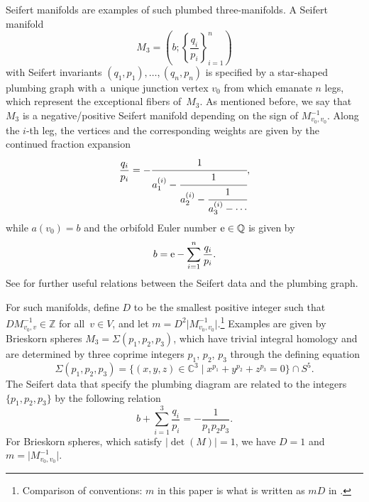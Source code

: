 \documentclass[pdftex]{sigma}
\theoremstyle{definition}
\numberwithin{equation}{section}
\begin{document}
Seifert manifolds are examples of such plumbed three-manifolds. A Seifert manifold
\begin{equation*}
 M_3=\left(b;\left\{\frac{q_i}{p_i}\right\}_{i=1}^{n}\right)
\end{equation*}
with Seifert invariants $(q_1,p_1), \ldots, (q_n, p_n)$ is specified by a star-shaped plumbing graph with a~unique junction vertex $v_0$ from which emanate $n$ legs, which represent the exceptional fibers of~$M_3$. As mentioned before, we say that $M_3$ is a negative/positive Seifert manifold depending on the sign of $M^{-1}_{v_0,v_0}$. Along the $i$-th leg, the vertices  and the corresponding weights 
are given by the continued fraction expansion
\begin{equation}
 \label{eqn:ctndfrac}
 \frac{q_i}{p_i}=-\cfrac{1}{a_{1}^{(i)}-\cfrac{1}{a^{(i)}_2-
 \cfrac{1}{a^{(i)}_3-\cdots}}},
\end{equation}
while $a(v_0)=b$ and the orbifold Euler number ${\rm e} \in \mathbb{Q}$ is given by
\begin{equation*}
 b={\rm e}-\sum\limits_{i=1}^n \frac{q_i}{p_i} .
\end{equation*}
See \cite[Appendix A]{chengUpC} for further useful relations between the Seifert data and the plumbing graph.

For such manifolds, define $D$ to be the smallest positive integer such that $DM_{v_0,v}^{-1}\in {\mathbb Z}$ for all~$v\in V$, and let $m=D^{2} \big\lvert M_{v_0,v_0}^{-1}\big\lvert$.\footnote{Comparison of conventions: $m$ in this paper is what is written as $mD$ in \cite{chengUpC}.} Examples are given by Brieskorn spheres $M_3 = \Sigma(p_1,p_2,p_3)$, which have trivial integral homology and are determined by three coprime integers $p_1$, $p_2$, $p_3$ through the defining equation
\begin{equation}\label{dfn:brieskorn}
 \Sigma(p_1,p_2,p_3)=
\bigl\{(x,y,z)\in\mathbb{C}^3 \mid x^{p_1}+y^{p_2}+z^{p_3} =0 \bigr\} \cap S^5 .
\end{equation}
The Seifert data that specify the plumbing diagram are related to the integers $\{ p_1,p_2,p_3 \}$ by the following relation
\begin{equation*}
 b+\sum_{i=1}^3 \frac{q_i}{p_i} =- \frac{1}{p_1p_2p_3}.
\end{equation*}
For Brieskorn spheres, which satisfy $\lvert \det (M)\lvert =1$, we have $D=1$ and $m= \big\lvert M_{v_0,v_0}^{-1}\big\lvert$.
\end{document}
